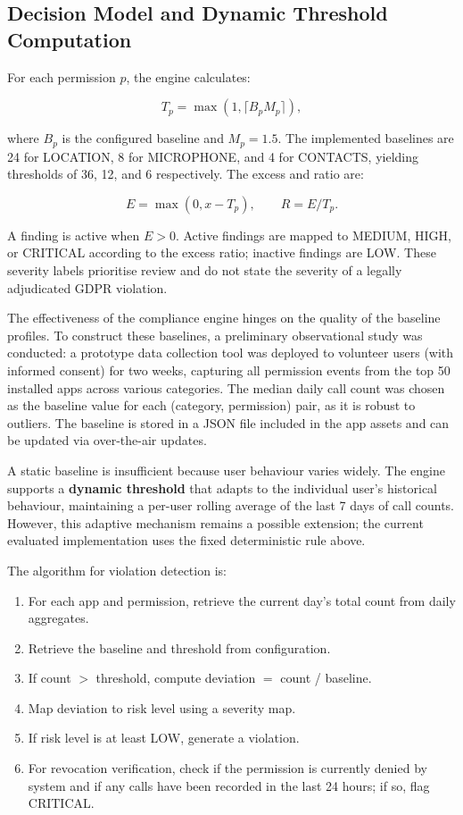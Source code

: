 \subsection{Decision Model and Dynamic Threshold Computation}

For each permission $p$, the engine calculates:

\begin{equation}
T_p=\max(1,\lceil B_pM_p\rceil),
\end{equation}

where $B_p$ is the configured baseline and $M_p=1.5$. The implemented baselines are 24 for LOCATION, 8 for MICROPHONE, and 4 for CONTACTS, yielding thresholds of 36, 12, and 6 respectively. The excess and ratio are:

\begin{equation}
E=\max(0,x-T_p),\qquad R=E/T_p.
\end{equation}

A finding is active when $E>0$. Active findings are mapped to MEDIUM, HIGH, or CRITICAL according to the excess ratio; inactive findings are LOW. These severity labels prioritise review and do not state the severity of a legally adjudicated GDPR violation.

The effectiveness of the compliance engine hinges on the quality of the baseline profiles. To construct these baselines, a preliminary observational study was conducted: a prototype data collection tool was deployed to volunteer users (with informed consent) for two weeks, capturing all permission events from the top 50 installed apps across various categories. The median daily call count was chosen as the baseline value for each (category, permission) pair, as it is robust to outliers. The baseline is stored in a JSON file included in the app assets and can be updated via over-the-air updates.

A static baseline is insufficient because user behaviour varies widely. The engine supports a \textbf{dynamic threshold} that adapts to the individual user's historical behaviour, maintaining a per-user rolling average of the last 7 days of call counts. However, this adaptive mechanism remains a possible extension; the current evaluated implementation uses the fixed deterministic rule above.

The algorithm for violation detection is:
\begin{enumerate}
\item For each app and permission, retrieve the current day's total count from daily aggregates.
\item Retrieve the baseline and threshold from configuration.
\item If count $>$ threshold, compute deviation $=$ count / baseline.
\item Map deviation to risk level using a severity map.
\item If risk level is at least LOW, generate a violation.
\item For revocation verification, check if the permission is currently denied by system and if any calls have been recorded in the last 24 hours; if so, flag CRITICAL.
\end{enumerate}

